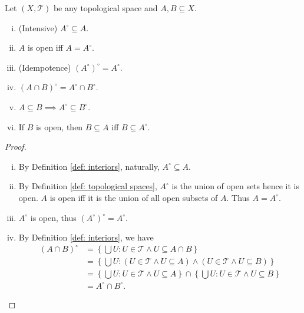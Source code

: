 \begin{proposition}
	\label{prop: properties of interiors}
	Let $(X, \mathcal T)$ be any topological space and $A, B \subseteq X$.
	\begin{enumerate}[(i)]
		\item
		(Intensive) $A^\circ \subseteq A$.
		
		\item
		$A$ is open iff $A = A^\circ$.
		
		\item
		(Idempotence) $(A^\circ)^\circ = A^\circ$.
		
		\item
		$(A \cap B)^\circ = A^\circ \cap B^\circ$.
		
		\item
		$A \subseteq B \implies A^\circ \subseteq B^\circ$.
		
		\item
		If $B$ is open, then $B \subseteq A$ iff $B \subseteq A^\circ$.
		
	\end{enumerate}
	
	\begin{proof} \
		\begin{enumerate}[(i)]
			\item
			By Definition \ref{def: interiors}, naturally, $A^\circ \subseteq A$.
			
			\item
			By Definition \ref{def: topological spaces}, $A^\circ$ is the union of open sets hence it is open. $A$ is open iff it is the union of all open subsets of $A$. Thus $A = A^\circ$.
			
			\item
			$A^\circ$ is open, thus $(A^\circ)^\circ = A^\circ$.
			
			\item
			By Definition \ref{def: interiors}, we have
			$$
			\begin{aligned}
				(A \cap B)^\circ &= \left\{ \bigcup U : U \in \mathcal T \land U \subseteq A \cap B \right\} \\
				&= \left\{ \bigcup U: (U \in \mathcal T \land U \subseteq A) \land (U \in \mathcal T \land U \subseteq B) \right\} \\
				&= \left\{ \bigcup U: U \in \mathcal T \land  U \subseteq A \right\} \cap \left\{ \bigcup U : U \in \mathcal T \land U \subseteq B \right\} \\
				&= A^\circ \cap B^\circ.
			\end{aligned}
			$$
			

\end{enumerate}
\end{proof}
\end{proposition}
